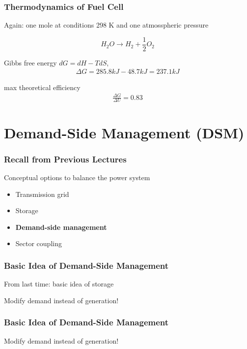 \documentclass[10pt,dvipsnames]{beamer}
\let\olditem\item
\renewcommand{\item}{%
\olditem\vspace{5pt}}
\begin{document}
\begin{frame}
 \frametitle{Thermodynamics of Fuel Cell}

  Again: one mole at conditions 298 K and one atmosspheric pressure

 \begin{equation*}
  H_2 O \rightarrow H_2 + \frac{1}{2} O_2
 \end{equation*}



 Gibbs free energy $dG = dH - TdS$,
 \begin{align*}
 \Delta G = 285.8 kJ - 48.7 kJ = 237.1 kJ
 \end{align*}

 max theoretical efficiency
 \begin{align*}
   \frac{\Delta G}{\Delta U} = 0.83
  \end{align*}

\end{frame}



\section{Demand-Side Management (DSM)}


\begin{frame}
 \frametitle{Recall from Previous Lectures}
 Conceptual options to balance the power system
 \begin{itemize}
  \item Transmission grid
  \item Storage
  \item \textbf{Demand-side management}
  \item Sector coupling
 \end{itemize}

\end{frame}

\begin{frame}
  \frametitle{Basic Idea of Demand-Side Management}

From last time: basic idea of storage
  \vspace{0.5cm}

  Modify demand instead of generation!
\end{frame}
\begin{frame}
  \frametitle{Basic Idea of Demand-Side Management}

 Modify demand instead of generation!
  \vspace{0.5cm}


\end{frame}
\end{document}
